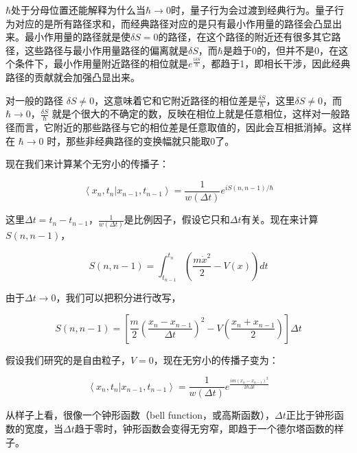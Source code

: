 $\hbar$处于分母位置还能解释为什么当$\hbar \to 0$时，量子行为会过渡到经典行为。量子行为对应的是所有路径求和，而经典路径对应的是只有最小作用量的路径会凸显出来。最小作用量的路径就是使$\delta S = 0$的路径，在这个路径的附近还有很多其它路径，这些路径与最小作用量路径的偏离就是$\delta S$，而$\hbar $是趋于0的，但并不是0，在这个条件下，最小作用量附近路径的相位就是$e^{\frac{i \delta S}{ \hbar}}$，都趋于1，即相长干涉，因此经典路径的贡献就会加强凸显出来。

对一般的路径 $ \delta S \neq 0$，这意味着它和它附近路径的相位差是$\frac {\delta S} { \hbar } $，这里$ \delta S \neq 0 $，而$\hbar \to 0 $，$\frac{\delta S}{\hbar} $ 就是个很大的不确定的数，反映在相位上就是任意相位，这样对一般路径而言，它附近的那些路径与它的相位差是任意取值的，因此会互相抵消掉。这样在 $\hbar \to 0$ 时，那些非经典路径的变换幅就只能取0了。


现在我们来计算某个无穷小的传播子：

\begin{equation}
\left\langle x_n, t_n | x_{n-1}, t_{n-1} \right\rangle = \frac{1}{w(\Delta t)} e^{iS(n, n-1) / \hbar}
\end{equation}

这里$\Delta t = t_n - t_{n-1}$，$\frac{1}{w(\Delta t)}$是比例因子，假设它只和$\Delta t$有关。现在来计算$S(n, n-1)$，

\begin{equation}
S(n, n-1) = \int_{t_{n-1}}^{t_n} \left( \frac{m \dot x^2}{2}  - V(x) \right) dt
\end{equation}

由于$\Delta t \to 0$，我们可以把积分进行改写，

\begin{equation}
S(n, n-1) = \left[  \frac{m}{2} \left( \frac{x_n - x_{n-1} }{\Delta t} \right)^2 -V \left( \frac{x_n + x_{n-1}}{2} \right) \right] \Delta t
\end{equation}

假设我们研究的是自由粒子，$V=0$，现在无穷小的传播子变为：

\begin{equation}
\left\langle x_n, t_n | x_{n-1}, t_{n-1} \right\rangle = \frac{1}{w(\Delta t)} e^{ \frac{i m ( x_n - x_{n-1} )^2 }{ 2 \hbar \Delta t} }
\end{equation}

从样子上看，很像一个钟形函数（bell function，或高斯函数），$\Delta t$正比于钟形函数的宽度，当$\Delta t$趋于零时，钟形函数会变得无穷窄，即趋于一个德尔塔函数的样子。

